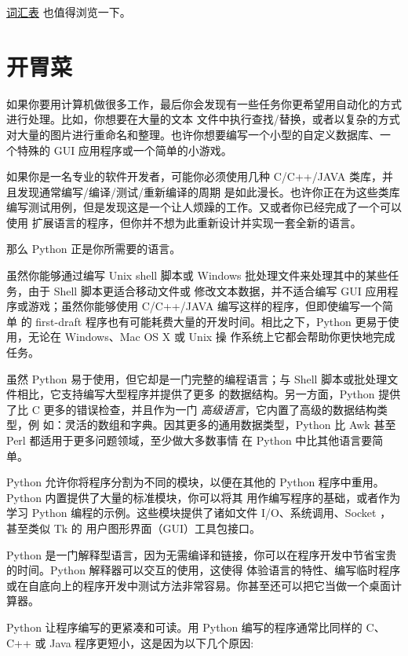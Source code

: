 \documentclass[a4paper,10pt,english]{sphinxmanual}
\begin{document}
\href{https://docs.python.org/3/glossary.html\#glossary}{词汇表} 也值得浏览一下。


\chapter{开胃菜}
\label{appetite:python}\label{appetite:tutorial-index}\label{appetite::doc}\label{appetite:id1}\label{appetite:tut-intro}
如果你要用计算机做很多工作，最后你会发现有一些任务你更希望用自动化的方式进行处理。比如，你想要在大量的文本
文件中执行查找/替换，或者以复杂的方式对大量的图片进行重命名和整理。也许你想要编写一个小型的自定义数据库、一
个特殊的 GUI 应用程序或一个简单的小游戏。

如果你是一名专业的软件开发者，可能你必须使用几种 C/C++/JAVA 类库，并且发现通常编写/编译/测试/重新编译的周期
是如此漫长。也许你正在为这些类库编写测试用例，但是发现这是一个让人烦躁的工作。又或者你已经完成了一个可以使用
扩展语言的程序，但你并不想为此重新设计并实现一套全新的语言。

那么 Python 正是你所需要的语言。

虽然你能够通过编写 Unix shell 脚本或 Windows 批处理文件来处理其中的某些任务，由于 Shell 脚本更适合移动文件或
修改文本数据，并不适合编写 GUI 应用程序或游戏；虽然你能够使用 C/C++/JAVA 编写这样的程序，但即使编写一个简单
的 first-draft 程序也有可能耗费大量的开发时间。相比之下，Python 更易于使用，无论在 Windows、Mac OS X 或 Unix 操
作系统上它都会帮助你更快地完成任务。

虽然 Python 易于使用，但它却是一门完整的编程语言；与 Shell 脚本或批处理文件相比，它支持编写大型程序并提供了更多
的数据结构。另一方面，Python 提供了比 C 更多的错误检查，并且作为一门 \emph{高级语言}，它内置了高级的数据结构类型，例
如：灵活的数组和字典。因其更多的通用数据类型，Python 比 Awk 甚至 Perl 都适用于更多问题领域，至少做大多数事情
在 Python 中比其他语言要简单。

Python 允许你将程序分割为不同的模块，以便在其他的 Python 程序中重用。Python 内置提供了大量的标准模块，你可以将其
用作编写程序的基础，或者作为学习 Python 编程的示例。这些模块提供了诸如文件 I/O、系统调用、Socket ，甚至类似 Tk 的
用户图形界面（GUI）工具包接口。

Python 是一门解释型语言，因为无需编译和链接，你可以在程序开发中节省宝贵的时间。Python 解释器可以交互的使用，这使得
体验语言的特性、编写临时程序或在自底向上的程序开发中测试方法非常容易。你甚至还可以把它当做一个桌面计算器。

Python 让程序编写的更紧凑和可读。用 Python 编写的程序通常比同样的 C、C++ 或 Java 程序更短小，这是因为以下几个原因:
\end{document}
